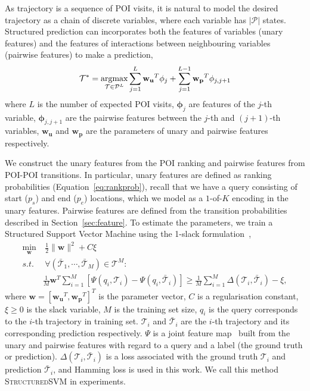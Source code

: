 As trajectory is a sequence of POI visits,
it is natural to model the desired trajectory %
as a chain of discrete variables, where each variable has $|\mathcal{P}|$ states.
Structured prediction can incorporates both the features of variables (unary features) and
the features of interactions between neighbouring variables (pairwise features) to make a
prediction,
\begin{displaymath}
    \mathcal{T}^* = \operatorname*{argmax}_{\mathcal{T} \in \mathcal{P}^L} 
                    \sum_{j=1}^L \mathbf{w_u}^T \mathbf{\phi}_j + \sum_{j=1}^{L-1} \mathbf{w_p}^T \mathbf{\phi}_{j, j+1}
\end{displaymath}
where $L$ is the number of expected POI visits, 
$\mathbf{\phi}_j$ are features of the $j$-th variable,
$\mathbf{\phi}_{j, j+1}$ are the pairwise features between the $j$-th and $(j+1)$-th variables, 
$\mathbf{w_u}$ and $\mathbf{w_p}$ are the parameters of unary and pairwise features respectively.

We construct the unary features from the POI ranking and pairwise features from POI-POI transitions.
In particular, unary features are defined as ranking probabilities (Equation~\ref{eq:rankprob}),
recall that we have a query consisting of start ($p_s$) and end ($p_e$) locations, 
which we model as a $1$-of-$K$ encoding in the unary features.
Pairwise features are defined from the transition probabilities %
described in Section~\ref{sec:feature}.
%
To estimate the parameters, we train a Structured Support Vector Machine using the 1-slack formulation~\cite{ssvm09},
\begin{align*}
    \min_{\mathbf{w}} & ~\frac{1}{2} \|\mathbf{w}\|^2 + C \xi \\
    s.t. & ~\forall \left( \bar{\mathcal{T}}_1, \cdots, \bar{\mathcal{T}}_M \right) \in \mathscr{T}^M: \\
         & \frac{1}{M} \mathbf{w}^T \sum_{i=1}^M \left[ \Psi(q_i, \mathcal{T}_i) - \Psi(q_i, \bar{\mathcal{T}}_i) \right] \ge 
           \frac{1}{M} \sum_{i=1}^M \Delta(\mathcal{T}_i, \bar{\mathcal{T}}_i) - \xi,
\end{align*}
where $\mathbf{w} = [\mathbf{w_u}^T, \mathbf{w_p}^T]^T$ is the parameter vector,
$C$ is a regularisation constant, $\xi \ge 0$ is the slack variable, $M$ is the training set size, 
$q_i$ is the query corresponds to the $i$-th trajectory in training set.
$\mathcal{T}_i$ and $\bar{\mathcal{T}}_i$ are the $i$-th trajectory and its corresponding prediction respectively.
$\Psi$ is a joint feature map~\cite{joachims2009predicting} built from the unary and pairwise features with regard to
 a query and a label (the ground truth or prediction).
$\Delta(\mathcal{T}_i, \bar{\mathcal{T}}_i)$ is a loss associated with the ground truth $\mathcal{T}_i$ 
and prediction $\bar{\mathcal{T}}_i$, and Hamming loss is used in this work.
We call this method \textsc{StructuredSVM} in experiments.
